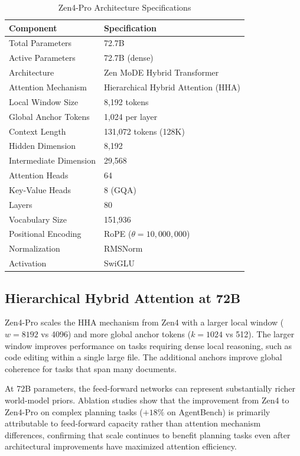 \documentclass[11pt,a4paper]{article}
\begin{document}
\begin{table}[H]
\centering
\begin{tabular}{ll}
\toprule
\textbf{Component} & \textbf{Specification} \\
\midrule
Total Parameters         & 72.7B \\
Active Parameters        & 72.7B (dense) \\
Architecture             & Zen MoDE Hybrid Transformer \\
Attention Mechanism      & Hierarchical Hybrid Attention (HHA) \\
Local Window Size        & 8,192 tokens \\
Global Anchor Tokens     & 1,024 per layer \\
Context Length           & 131,072 tokens (128K) \\
Hidden Dimension         & 8,192 \\
Intermediate Dimension   & 29,568 \\
Attention Heads          & 64 \\
Key-Value Heads          & 8 (GQA) \\
Layers                   & 80 \\
Vocabulary Size          & 151,936 \\
Positional Encoding      & RoPE ($\theta = 10{,}000{,}000$) \\
Normalization            & RMSNorm \\
Activation               & SwiGLU \\
\bottomrule
\end{tabular}
\caption{Zen4-Pro Architecture Specifications}
\end{table}

\subsection{Hierarchical Hybrid Attention at 72B}

Zen4-Pro scales the HHA mechanism from Zen4 with a larger local window ($w = 8192$ vs 4096)
and more global anchor tokens ($k = 1024$ vs 512). The larger window improves performance on
tasks requiring dense local reasoning, such as code editing within a single large file.
The additional anchors improve global coherence for tasks that span many documents.

At 72B parameters, the feed-forward networks can represent substantially richer world-model
priors. Ablation studies show that the improvement from Zen4 to Zen4-Pro on complex planning
tasks ($+18\%$ on AgentBench) is primarily attributable to feed-forward capacity rather than
attention mechanism differences, confirming that scale continues to benefit planning tasks even
after architectural improvements have maximized attention efficiency.
\end{document}
